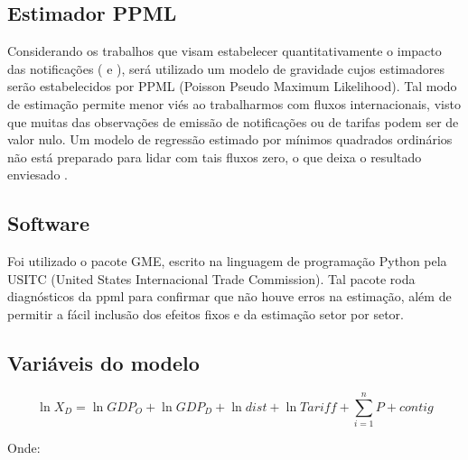 \documentclass[12pt, a4paper]{article}
\begin{document}
\subsection{Estimador PPML}
Considerando os trabalhos que visam estabelecer quantitativamente o impacto das notificações (\cite{impactosprodquimicos} e \cite{ALMEIDA2014}), será utilizado um modelo de gravidade cujos estimadores serão estabelecidos por PPML (Poisson Pseudo Maximum Likelihood). Tal modo de estimação permite menor viés ao trabalharmos com fluxos internacionais, visto que muitas das observações de emissão de notificações ou de tarifas podem ser de valor nulo. Um modelo de regressão estimado por mínimos quadrados ordinários não está preparado para lidar com tais fluxos zero, o que deixa o resultado enviesado \cite{Log_Of_Gravity}.

\subsection{Software}
Foi utilizado o pacote GME, escrito na linguagem de programação Python pela USITC (United States Internacional Trade Commission). Tal pacote roda diagnósticos da ppml para confirmar que não houve erros na estimação, além de permitir a fácil inclusão dos efeitos fixos e da estimação setor por setor.

\subsection{Variáveis do modelo}

\begin{equation}
    \ln X_{D} = 
    \ln GDP_{O} 
    + \ln GDP_{D} 
    + \ln dist 
    + \ln Tariff 
    + \sum_{i=1}^{n} P 
    + contig 
\end{equation}

Onde:
\end{document}
